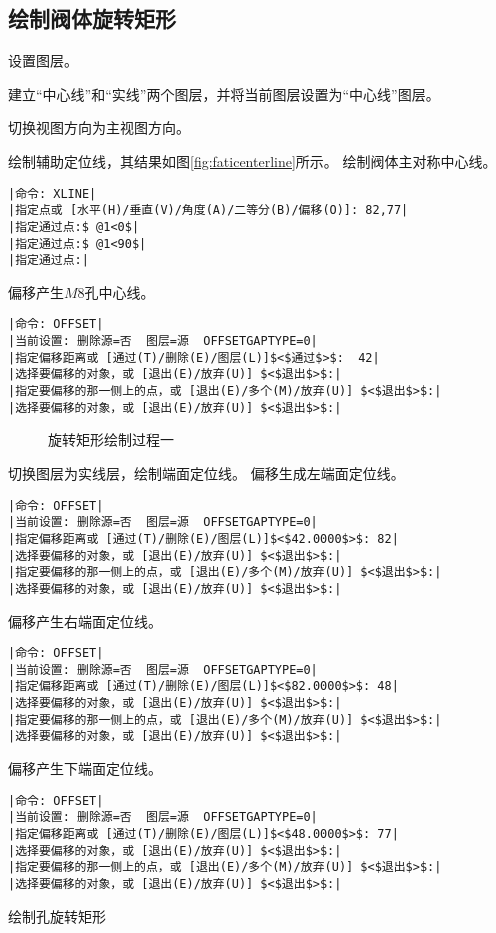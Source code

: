 \subsection{绘制阀体旋转矩形}
\begin{procedure}
\item 设置图层。

建立“中心线”和“实线”两个图层，并将当前图层设置为“中心线”图层。
\item 切换视图方向为主视图方向。
\item 绘制辅助定位线，其结果如图\ref{fig:faticenterline}所示。
绘制阀体主对称中心线。
\begin{lstlisting}
|命令: XLINE|
|指定点或 [水平(H)/垂直(V)/角度(A)/二等分(B)/偏移(O)]: 82,77|
|指定通过点:$ @1<0$|
|指定通过点:$ @1<90$|
|指定通过点:|
\end{lstlisting}
偏移产生$M8$孔中心线。
\begin{lstlisting}
|命令: OFFSET|
|当前设置: 删除源=否  图层=源  OFFSETGAPTYPE=0|
|指定偏移距离或 [通过(T)/删除(E)/图层(L)]$<$通过$>$:  42|
|选择要偏移的对象，或 [退出(E)/放弃(U)] $<$退出$>$:|
|指定要偏移的那一侧上的点，或 [退出(E)/多个(M)/放弃(U)] $<$退出$>$:|
|选择要偏移的对象，或 [退出(E)/放弃(U)] $<$退出$>$:|
\end{lstlisting}
\begin{figure}[htbp]
\centering
{}\hspace{30pt}
\hspace{30pt}
\caption{旋转矩形绘制过程一}
\end{figure}
\item 切换图层为实线层，绘制端面定位线。
偏移生成左端面定位线。
\begin{lstlisting}
|命令: OFFSET|
|当前设置: 删除源=否  图层=源  OFFSETGAPTYPE=0|
|指定偏移距离或 [通过(T)/删除(E)/图层(L)]$<$42.0000$>$: 82|
|选择要偏移的对象，或 [退出(E)/放弃(U)] $<$退出$>$:|
|指定要偏移的那一侧上的点，或 [退出(E)/多个(M)/放弃(U)] $<$退出$>$:|
|选择要偏移的对象，或 [退出(E)/放弃(U)] $<$退出$>$:|
\end{lstlisting}
偏移产生右端面定位线。
\begin{lstlisting}
|命令: OFFSET|
|当前设置: 删除源=否  图层=源  OFFSETGAPTYPE=0|
|指定偏移距离或 [通过(T)/删除(E)/图层(L)]$<$82.0000$>$: 48|
|选择要偏移的对象，或 [退出(E)/放弃(U)] $<$退出$>$:|
|指定要偏移的那一侧上的点，或 [退出(E)/多个(M)/放弃(U)] $<$退出$>$:|
|选择要偏移的对象，或 [退出(E)/放弃(U)] $<$退出$>$:|
\end{lstlisting}
偏移产生下端面定位线。
\begin{lstlisting}
|命令: OFFSET|
|当前设置: 删除源=否  图层=源  OFFSETGAPTYPE=0|
|指定偏移距离或 [通过(T)/删除(E)/图层(L)]$<$48.0000$>$: 77|
|选择要偏移的对象，或 [退出(E)/放弃(U)] $<$退出$>$:|
|指定要偏移的那一侧上的点，或 [退出(E)/多个(M)/放弃(U)] $<$退出$>$:|
|选择要偏移的对象，或 [退出(E)/放弃(U)] $<$退出$>$:|
\end{lstlisting}
\item 绘制孔旋转矩形


\end{procedure}
